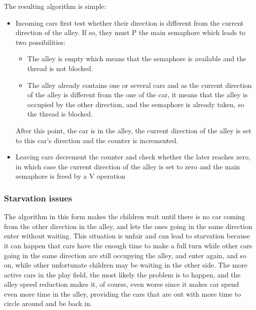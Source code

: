 The resulting algorithm is simple: 
\begin{itemize}
    \item Incoming cars first test whether their direction is different from the
    current direction of the alley. If so, they must P the main semaphore which
    leads to two possibilities:
    \begin{itemize}
        \item The alley is empty which means that the semaphore is available and
        the thread is not blocked.
        \item The alley already contains one or several cars and as the current
        direction of the alley is different from the one of the car, it means
        that the alley is occupied by the other direction, and the semaphore is
        already taken, so the thread is blocked.
    \end{itemize}
    After this point, the car is in the alley, the current direction of the
    alley is set to this car's direction and the counter is incremented.
    \item Leaving cars decrement the counter and check whether the later
    reaches zero, in which case the current direction of the alley is set to
    zero and the main semaphore is freed by a V operation
\end{itemize}

\subsubsection{Starvation issues}

The algorithm in this form makes the children wait until there is no car coming
from the other direction in the alley, and lets the ones going in the same
direction enter without waiting. This situation is unfair and can lead to
starvation because it can happen that cars have the enough time to make a full
turn while other cars going in the same direction are still occupying the alley,
and enter again, and so on, while other unfortunate children may be waiting in
the other side. The more active cars in the play field, the most likely the
problem is to happen, and the alley speed reduction makes it, of course, even
worse since it makes car spend even more time in the alley, providing the cars
that are out with more time to circle around and be back in.

